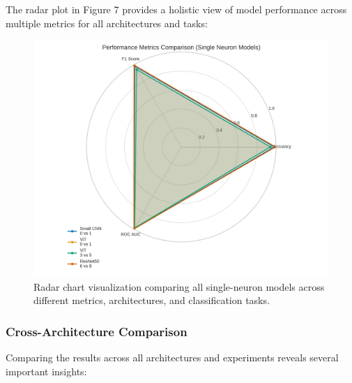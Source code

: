 \documentclass[11pt]{article}
\begin{document}
The radar plot in Figure 7 provides a holistic view of model performance across multiple metrics for all architectures and tasks:

\begin{figure}[htbp]
\centering
\includegraphics[width=\textwidth]{figures/radar_chart_comparison.png}
\caption{Radar chart visualization comparing all single-neuron models across different metrics, architectures, and classification tasks.}
\end{figure}

\subsubsection{Cross-Architecture Comparison}
Comparing the results across all architectures and experiments reveals several important insights:
\end{document}
